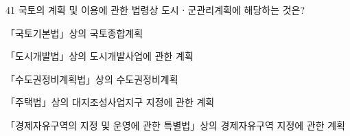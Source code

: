 \begin{question}{41}
국토의 계획 및 이용에 관한 법령상 도시ㆍ군관리계획에 해당하는 것은?
\begin{choices}
  \item 「국토기본법」상의 국토종합계획
  \item 「도시개발법」상의 도시개발사업에 관한 계획
  \item 「수도권정비계획법」상의 수도권정비계획
  \item 「주택법」상의 대지조성사업지구 지정에 관한 계획
  \item 「경제자유구역의 지정 및 운영에 관한 특별법」상의 경제자유구역 지정에 관한 계획
\end{choices}
\end{question}
